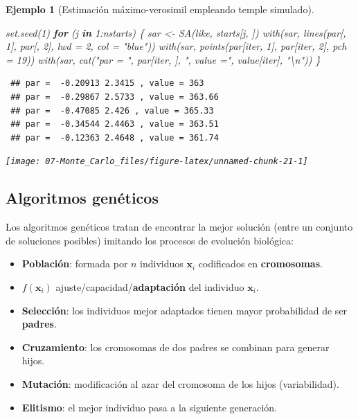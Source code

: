 \documentclass[
  10pt,
]{book}
\newenvironment{Shaded}{\begin{snugshade}}{\end{snugshade}}
\newcommand{\AttributeTok}[1]{\textcolor[rgb]{0.77,0.63,0.00}{#1}}
\newcommand{\ControlFlowTok}[1]{\textcolor[rgb]{0.13,0.29,0.53}{\textbf{#1}}}
\newcommand{\DecValTok}[1]{\textcolor[rgb]{0.00,0.00,0.81}{#1}}
\newcommand{\FunctionTok}[1]{\textcolor[rgb]{0.00,0.00,0.00}{#1}}
\newcommand{\NormalTok}[1]{#1}
\newcommand{\OtherTok}[1]{\textcolor[rgb]{0.56,0.35,0.01}{#1}}
\newcommand{\SpecialCharTok}[1]{\textcolor[rgb]{0.00,0.00,0.00}{#1}}
\newcommand{\StringTok}[1]{\textcolor[rgb]{0.31,0.60,0.02}{#1}}
\renewcommand{\mathbf}[1]{\symbf{#1}}
\theoremstyle{break}
\newtheorem{example}{Ejemplo}[chapter]
\theoremstyle{nonumberplain}
\begin{document}
\begin{example}[Estimación máximo-verosimil empleando temple simulado]
\begin{Shaded}
\begin{Highlighting}[]
\FunctionTok{set.seed}\NormalTok{(}\DecValTok{1}\NormalTok{)}
\ControlFlowTok{for}\NormalTok{ (j }\ControlFlowTok{in} \DecValTok{1}\SpecialCharTok{:}\NormalTok{nstarts) \{}
\NormalTok{  sar }\OtherTok{\textless{}{-}} \FunctionTok{SA}\NormalTok{(like, starts[j, ])}
  \FunctionTok{with}\NormalTok{(sar, }\FunctionTok{lines}\NormalTok{(par[, }\DecValTok{1}\NormalTok{], par[, }\DecValTok{2}\NormalTok{], }\AttributeTok{lwd =} \DecValTok{2}\NormalTok{, }\AttributeTok{col =} \StringTok{"blue"}\NormalTok{))}
  \FunctionTok{with}\NormalTok{(sar, }\FunctionTok{points}\NormalTok{(par[iter, }\DecValTok{1}\NormalTok{], par[iter, }\DecValTok{2}\NormalTok{], }\AttributeTok{pch =} \DecValTok{19}\NormalTok{))}
  \FunctionTok{with}\NormalTok{(sar, }\FunctionTok{cat}\NormalTok{(}\StringTok{"par = "}\NormalTok{, par[iter, ], }\StringTok{", value ="}\NormalTok{, value[iter], }\StringTok{"}\SpecialCharTok{\textbackslash{}n}\StringTok{"}\NormalTok{))}
\NormalTok{\}}
\end{Highlighting}
\end{Shaded}

\begin{verbatim}
 ## par =  -0.20913 2.3415 , value = 363 
 ## par =  -0.29867 2.5733 , value = 363.66 
 ## par =  -0.47085 2.426 , value = 365.33 
 ## par =  -0.34544 2.4463 , value = 363.51 
 ## par =  -0.12363 2.4648 , value = 361.74
\end{verbatim}

\begin{center}\texttt{[image: 07-Monte\_Carlo\_files/figure-latex/unnamed-chunk-21-1]} \end{center}

\end{example}

\hypertarget{algoritmos-genuxe9ticos}{%
\subsection{Algoritmos genéticos}\label{algoritmos-genuxe9ticos}}

Los algoritmos genéticos tratan de encontrar la mejor solución
(entre un conjunto de soluciones posibles) imitando los procesos de
evolución biológica:

\begin{itemize}
\item
  \textbf{Población}: formada por \(n\) individuos \(\mathbf{x}_i\)
  codificados en \textbf{cromosomas}.
\item
  \(f(\mathbf{x}_i)\) ajuste/capacidad/\textbf{adaptación} del
  individuo \(\mathbf{x}_i\).
\item
  \textbf{Selección}: los individuos mejor adaptados tienen mayor
  probabilidad de ser \textbf{padres}.
\item
  \textbf{Cruzamiento}: los cromosomas de dos padres se combinan para
  generar hijos.
\item
  \textbf{Mutación}: modificación al azar del cromosoma de los
  hijos (variabilidad).
\item
  \textbf{Elitismo}: el mejor individuo pasa a la siguiente generación.
\end{itemize}
\end{document}
